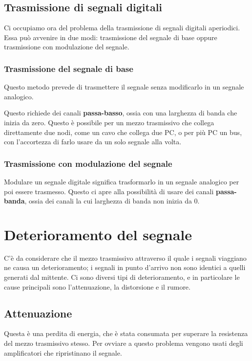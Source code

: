     \subsection{Trasmissione di segnali digitali}
        Ci occupiamo ora del problema della trasmissione di segnali digitali aperiodici. Essa può avvenire in due modi: trasmissione del segnale di base oppure trasmissione con modulazione del segnale.
        
        \subsubsection{Trasmissione del segnale di base}
            Questo metodo prevede di trasmettere il segnale senza modificarlo in un segnale analogico.
            
            Questo richiede dei canali \textbf{passa-basso}, ossia con una larghezza di banda che inizia da zero. Questo è possibile per un mezzo trasmissivo che collega direttamente due nodi, come un cavo che collega due PC, o per più PC un bus, con l'accortezza di farlo usare da un solo segnale alla volta.
            
        \subsubsection{Trasmissione con modulazione del segnale}
            Modulare un segnale digitale significa trasformarlo in un segnale analogico per poi essere trasmesso. Questo ci apre alla possibilità di usare dei canali \textbf{passa-banda}, ossia dei canali la cui larghezza di banda non inizia da 0.
            
\section{Deterioramento del segnale}
    C'è da considerare che il mezzo trasmissivo attraverso il quale i segnali viaggiano ne causa un deterioramento; i segnali in punto d'arrivo non sono identici a quelli generati dal mittente. Ci sono diversi tipi di deterioramento, e in particolare le cause principali sono l'attenuazione, la distorsione e il rumore.
    
    \subsection{Attenuazione}
        Questa è una perdita di energia, che è stata consumata per superare la resistenza del mezzo trasmissivo stesso. Per ovviare a questo problema vengono usati degli amplificatori che ripristinano il segnale.
        
